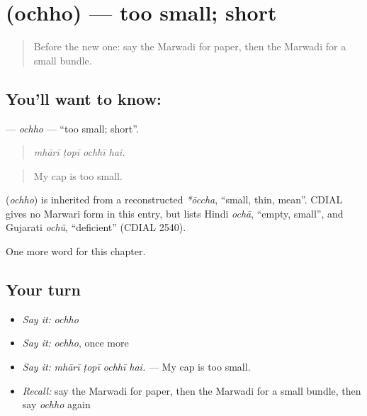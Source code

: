 \section[\texorpdfstring{\mw{ओछो} (ochho)}{ओछो (ochho)}]{ (ochho) — too small; short}

\label{lesson:MW-C215-ochho}



\begin{quote}
Before the new one: say the Marwadi for paper, then the Marwadi for a small bundle.
\end{quote}

\subsection*{You'll want to know: }
\textbf{} — \emph{ochho} — \textquotedblleft{}too small; short\textquotedblright{}.

\begin{quote}
   
\end{quote}

\begin{quote}
\emph{mhārī ṭopī ochhī hai.}
\end{quote}

\begin{quote}
My cap is too small.
\end{quote}

\begin{cousinweb}
\textbf{} (\emph{ochho}) is inherited from a reconstructed \emph{*ōccha}, \textquotedblleft{}small, thin, mean\textquotedblright{}. CDIAL gives no Marwari form in this entry, but lists Hindi \emph{ochā}, \textquotedblleft{}empty, small\textquotedblright{}, and Gujarati \emph{ochũ}, \textquotedblleft{}deficient\textquotedblright{} (CDIAL 2540).
\end{cousinweb}

\begin{grammarlens}[title={What you've built}]
One more word for this chapter.
\end{grammarlens}

\subsection*{Your turn}
\begin{itemize}
\raggedright
  \item \emph{Say it:} \emph{ochho}
  \item \emph{Say it:} \emph{ochho}, once more
  \item \emph{Say it:} \emph{mhārī ṭopī ochhī hai.} — My cap is too small.
  \item \emph{Recall:} say the Marwadi for paper, then the Marwadi for a small bundle, then say \emph{ochho} again
\end{itemize}


